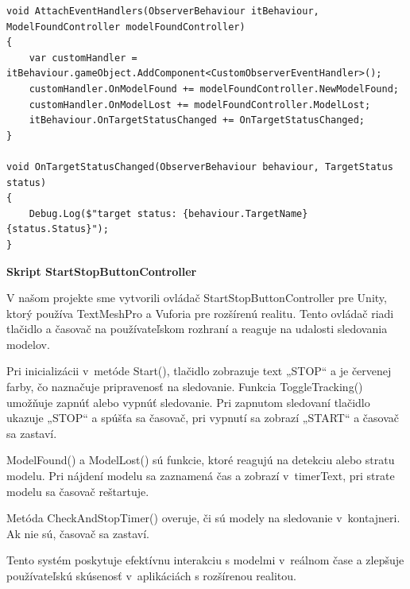 \begin{lstlisting}[caption={LoadMultipleTargetsFromDatabase Class - Dynamické loadovanie ModelTarget-ov z databázy}, label=loadMultipleTargetsFromDatabase]
void AttachEventHandlers(ObserverBehaviour itBehaviour, ModelFoundController modelFoundController)
{
    var customHandler = itBehaviour.gameObject.AddComponent<CustomObserverEventHandler>();
    customHandler.OnModelFound += modelFoundController.NewModelFound;
    customHandler.OnModelLost += modelFoundController.ModelLost;
    itBehaviour.OnTargetStatusChanged += OnTargetStatusChanged;
}

void OnTargetStatusChanged(ObserverBehaviour behaviour, TargetStatus status)
{
    Debug.Log($"target status: {behaviour.TargetName} {status.Status}");
}
\end{lstlisting} 

{\large\textbf{Skript StartStopButtonController}}

V našom projekte sme vytvorili ovládač StartStopButtonController pre Unity, ktorý používa TextMeshPro a Vuforia pre rozšírenú realitu. Tento ovládač riadi tlačidlo a časovač na používateľskom rozhraní a reaguje na udalosti sledovania modelov.

Pri inicializácii v~metóde Start(), tlačidlo zobrazuje text „STOP“ a je červenej farby, čo naznačuje pripravenosť na sledovanie. Funkcia ToggleTracking() umožňuje zapnúť alebo vypnúť sledovanie. Pri zapnutom sledovaní tlačidlo ukazuje „STOP“ a spúšťa sa časovač, pri vypnutí sa zobrazí „START“ a časovač sa zastaví.

ModelFound() a ModelLost() sú funkcie, ktoré reagujú na detekciu alebo stratu modelu. Pri nájdení modelu sa zaznamená čas a zobrazí v~timerText, pri strate modelu sa časovač reštartuje.

Metóda CheckAndStopTimer() overuje, či sú modely na sledovanie v~kontajneri. Ak nie sú, časovač sa zastaví.

Tento systém poskytuje efektívnu interakciu s modelmi v~reálnom čase a zlepšuje používateľskú skúsenosť v~aplikáciách s rozšírenou realitou.

